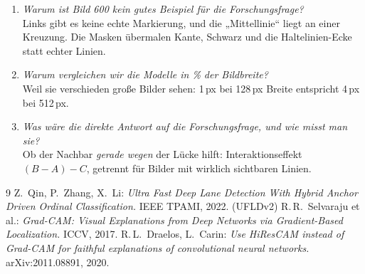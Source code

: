\documentclass[11pt,a4paper]{article}
\begin{document}
\begin{enumerate}[label=\textbf{\arabic*.}, leftmargin=1.6em]
\item \emph{Warum ist Bild 600 kein gutes Beispiel für die Forschungsfrage?}\\
  \small Links gibt es keine echte Markierung, und die „Mittellinie“ liegt an einer Kreuzung. Die
  Masken übermalen Kante, Schwarz und die Haltelinien-Ecke statt echter Linien.\normalsize

\item \emph{Warum vergleichen wir die Modelle in \% der Bildbreite?}\\
  \small Weil sie verschieden große Bilder sehen: 1\,px bei 128\,px Breite entspricht 4\,px bei 512\,px.\normalsize

\item \emph{Was wäre die direkte Antwort auf die Forschungsfrage, und wie misst man sie?}\\
  \small Ob der Nachbar \emph{gerade wegen} der Lücke hilft: Interaktionseffekt $(B-A)-C$,
  getrennt für Bilder mit wirklich sichtbaren Linien.\normalsize
\end{enumerate}

\begin{thebibliography}{9}
 Z.~Qin, P.~Zhang, X.~Li: \emph{Ultra Fast Deep Lane Detection With Hybrid Anchor
  Driven Ordinal Classification.} IEEE TPAMI, 2022. (UFLDv2)
 R.\,R.~Selvaraju et al.: \emph{Grad-CAM: Visual Explanations from Deep Networks
  via Gradient-Based Localization.} ICCV, 2017.
 R.\,L.~Draelos, L.~Carin: \emph{Use HiResCAM instead of Grad-CAM for faithful
  explanations of convolutional neural networks.} arXiv:2011.08891, 2020.
\end{thebibliography}
\end{document}
